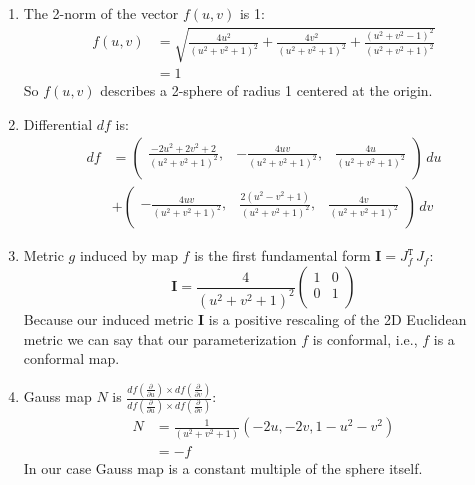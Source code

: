 \documentclass{article}
\newcommand\ifrac[2]{{\displaystyle\frac{#1}{#2}}}
\begin{document}
\begin{enumerate}[label=(\alph*)]
    \item
    The 2-norm of the vector $f(u,v)$ is 1:
    \begin{align*} 
        f(u,v) &= \sqrt{\frac{4 u^2}{\left(u^2+v^2+1\right)^2}+\frac{4 v^2}{\left(u^2+v^2+1\right)^2}+\frac{\left(u^2+v^2-1\right)^2}{\left(u^2+v^2+1\right)^2}}\\
            &= 1
    \end{align*}
    So $f(u,v)$ describes a 2-sphere of radius 1 centered at the origin.

    \item
    Differential $df$ is:
    \begin{align*}
        df &=
        \left(
        \begin{array}{ccc}
        \ifrac{-2 u^2+2 v^2+2}{\left(u^2+v^2+1\right)^2}, & -\ifrac{4 u v}{\left(u^2+v^2+1\right)^2}, & \ifrac{4 u}{\left(u^2+v^2+1\right)^2} \\
        \end{array}
        \right)\, du \\
        &+ 
        \left(
        \begin{array}{ccc}
        -\ifrac{4 u v}{\left(u^2+v^2+1\right)^2}, & \ifrac{2 \left(u^2-v^2+1\right)}{\left(u^2+v^2+1\right)^2}, & \ifrac{4 v}{\left(u^2+v^2+1\right)^2} \\
        \end{array}
        \right)\, dv
    \end{align*}

    \item
    Metric $g$ induced by map $f$ is the first fundamental form $\mathbf{I} = J_f^\texttt{T} \, J_f$:
    $$
        \mathbf{I} =
        \ifrac{4}{\left(u^2+v^2+1\right)^2}
        \left(
        \begin{array}{cc}
        1 & 0 \\
        0 & 1 \\
        \end{array}
        \right)
    $$
    Because our induced metric $\mathbf{I}$ is a positive rescaling of the 2D Euclidean metric we can say that our
    parameterization $f$ is conformal, i.e., $f$ is a conformal map.

    \item
    Gauss map $N$ is $\ifrac{df(\frac{\partial}{\partial u}) \times df(\frac{\partial}{\partial v})}{df(\frac{\partial}{\partial u}) \times df(\frac{\partial}{\partial v})}$:
    \begin{align*}
        N &= \ifrac{1}{\left(u^2+v^2+1\right)} \left(-2 u,-2 v,1-u^2-v^2\right)\\
            &= -f
    \end{align*}
    In our case Gauss map is a constant multiple of the sphere itself.


\end{enumerate}
\end{document}
